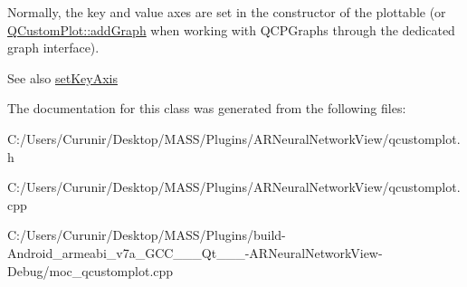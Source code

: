 Normally, the key and value axes are set in the constructor of the plottable (or \hyperlink{class_q_custom_plot_a6fb2873d35a8a8089842d81a70a54167}{Q\+Custom\+Plot\+::add\+Graph} when working with Q\+C\+P\+Graphs through the dedicated graph interface).

\begin{DoxySeeAlso}{See also}
\hyperlink{class_q_c_p_abstract_plottable_a8524fa2994c63c0913ebd9bb2ffa3920}{set\+Key\+Axis} 
\end{DoxySeeAlso}


The documentation for this class was generated from the following files\+:\begin{DoxyCompactItemize}
\item 
C\+:/\+Users/\+Curunir/\+Desktop/\+M\+A\+S\+S/\+Plugins/\+A\+R\+Neural\+Network\+View/qcustomplot.\+h\item 
C\+:/\+Users/\+Curunir/\+Desktop/\+M\+A\+S\+S/\+Plugins/\+A\+R\+Neural\+Network\+View/qcustomplot.\+cpp\item 
C\+:/\+Users/\+Curunir/\+Desktop/\+M\+A\+S\+S/\+Plugins/build-\/\+Android\+\_\+armeabi\+\_\+v7a\+\_\+\+G\+C\+C\+\_\+\_\+\_\+\+Qt\+\_\+\_\+\_-\/\+A\+R\+Neural\+Network\+View-\/\+Debug/moc\+\_\+qcustomplot.\+cpp\end{DoxyCompactItemize}
